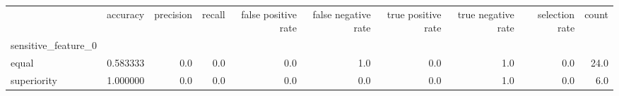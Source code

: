 \begin{tabular}{lrrrrrrrrr}
\toprule
{} &  accuracy &  precision &  recall &  false positive rate &  false negative rate &  true positive rate &  true negative rate &  selection rate &  count \\
sensitive\_feature\_0 &           &            &         &                      &                      &                     &                     &                 &        \\
\midrule
equal               &  0.583333 &        0.0 &     0.0 &                  0.0 &                  1.0 &                 0.0 &                 1.0 &             0.0 &   24.0 \\
superiority         &  1.000000 &        0.0 &     0.0 &                  0.0 &                  0.0 &                 0.0 &                 1.0 &             0.0 &    6.0 \\
\bottomrule
\end{tabular}
